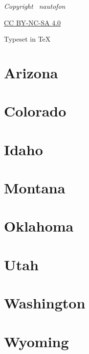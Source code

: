 {
\centering \vspace{30mm} \footnotesize \itshape
Copyright \raisebox{.2ex}{\scriptsize\copyright} \the\year\ nautofon \par
\vspace{.4ex}
\href{https://creativecommons.org/licenses/by-nc-sa/4.0/}{CC BY-NC-SA 4.0} \par
\vspace{.4ex}
Typeset in \TeX \par
}
\thispagestyle{empty}

\tableofcontents
\thispagestyle{empty}

\chapter{Arizona}


\chapter{Colorado}


\chapter{Idaho}


\chapter{Montana}


\chapter{Oklahoma}


\chapter{Utah}


\chapter{Washington}


\chapter{Wyoming}



